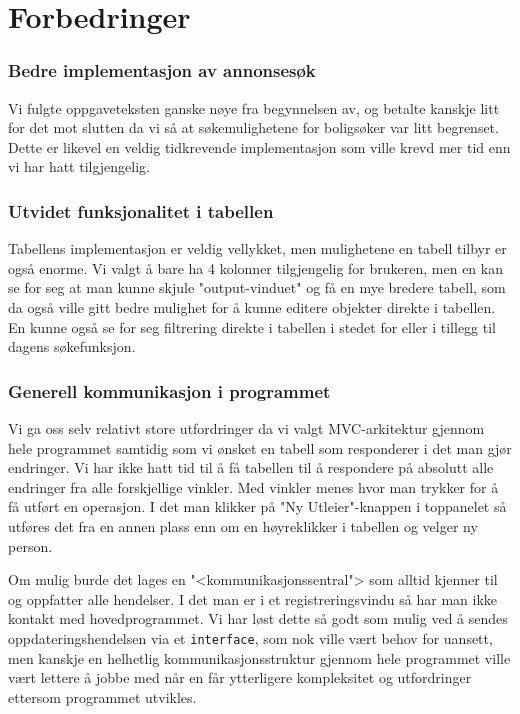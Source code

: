 \section{Forbedringer}

\subsubsection{Bedre implementasjon av annonsesøk}
Vi fulgte oppgaveteksten ganske nøye fra begynnelsen av, og betalte kanskje litt for det mot slutten da vi så at søkemulighetene for boligsøker var litt begrenset.
Dette er likevel en veldig tidkrevende implementasjon som ville krevd mer tid enn vi har hatt tilgjengelig.

\subsubsection{Utvidet funksjonalitet i tabellen}
Tabellens implementasjon er veldig vellykket, men mulighetene en tabell tilbyr er også enorme. Vi valgt å bare ha 4 kolonner tilgjengelig for brukeren, men en kan se for seg at man kunne skjule "output-vinduet" og få en mye bredere tabell, som da også ville gitt bedre mulighet for å kunne editere objekter direkte i tabellen.
En kunne også se for seg filtrering direkte i tabellen i stedet for eller i tillegg til dagens søkefunksjon.

\subsubsection{Generell kommunikasjon i programmet}
Vi ga oss selv relativt store utfordringer da vi valgt MVC-arkitektur gjennom hele programmet samtidig som vi ønsket en tabell som responderer i det man gjør endringer. Vi har ikke hatt tid til å få tabellen til å respondere på absolutt alle endringer fra alle forskjellige vinkler. Med vinkler menes hvor man trykker for å få utført en operasjon. I det man klikker på "Ny Utleier"-knappen i toppanelet så utføres det fra en annen plass enn om en høyreklikker i tabellen og velger ny person.

Om mulig burde det lages en "<kommunikasjonssentral"> som alltid kjenner til og oppfatter alle hendelser. I det man er i et registreringsvindu så har man ikke kontakt med hovedprogrammet. Vi har løst dette så godt som mulig ved å sendes oppdateringshendelsen via et \texttt{interface}, som nok ville vært behov for uansett, men kanskje en helhetlig kommunikasjonsstruktur gjennom hele programmet ville vært lettere å jobbe med når en får ytterligere kompleksitet og utfordringer ettersom programmet utvikles.

